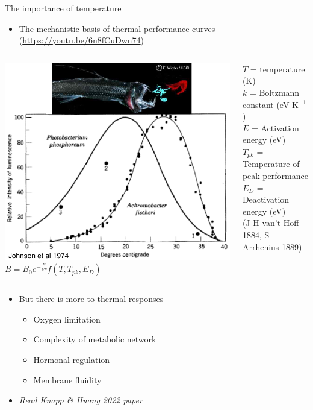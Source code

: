 \begin{frame}{The importance of temperature}

	\begin{itemize}
		\item The mechanistic basis of thermal performance curves (\url{https://youtu.be/6n8fCuDwn74}) 
	\end{itemize}

\begin{columns}[c]
    \pause
      \includegraphics[width=\textwidth]{graphics/Photobacterium.pdf}
  \pause
  \scriptsize
    $B = B_0 \boxed {e^{-\frac{E}{kT}}}f(T,T_{pk},E_D)$\\
    \vspace{10pt}
    \raggedright{$T$ = temperature (K)\\
     $k$ = Boltzmann constant (eV K$^{-1}$)}\\
     $E$ = Activation energy (eV)\\
     $T_{pk}$ = Temperature of peak performance\\
	 $E_D$ = Deactivation energy (eV)\\
	 
    {\tiny (J H van't Hoff 1884, S Arrhenius 1889)}
\end{columns}

\begin{itemize}\setlength{\itemindent}{0em}
  \pause
  \item But there is more to thermal responses
    \begin{itemize}\setlength{\itemindent}{-1em}
     \item Oxygen limitation
     \item Complexity of metabolic network
     \item Hormonal regulation
     \item Membrane fluidity
    \end{itemize}
    \pause
  \item \textit{Read Knapp \& Huang 2022 paper}\\


\end{itemize}
\end{frame}
